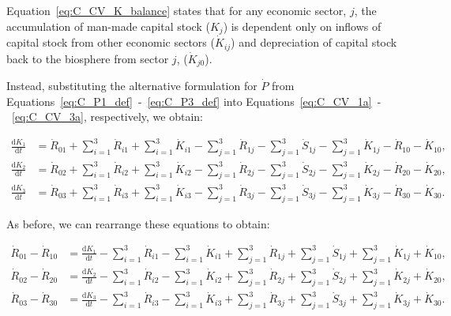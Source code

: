\noindent{}Equation~\ref{eq:C_CV_K_balance} states that
for any economic sector, $j$,
the accumulation of man-made capital stock ($K_{j}$)
is dependent only on inflows of capital stock
from other economic sectors
($\dot{K}_{ij}$)
and depreciation of capital stock back to the
biosphere from sector $j$, ($\dot{K}_{j0}$).

Instead,
substituting the alternative formulation for $\dot{P}$
from Equations~\ref{eq:C_P1_def}~-~\ref{eq:C_P3_def}
into Equations~\ref{eq:C_CV_1a}~-~\ref{eq:C_CV_3a},
respectively,
we obtain:

\begin{align} \label{eq:C_CV_1c}
	\frac{\mathrm{d}K_{1}}{\mathrm{d}t}	&
	= \dot{R}_{01}
	+ \sum_{i = 1}^{3}\dot{R}_{i1}
	+ \sum_{i = 1}^{3}\dot{K}_{i1}
	- \sum_{j = 1}^{3}\dot{R}_{1j}
	- \sum_{j = 1}^{3}\dot{S}_{1j}
	- \sum_{j = 1}^{3}\dot{K}_{1j}
	- \dot{R}_{10} 
	- \dot{K}_{10},										\\
	\label{eq:C_CV_2c}
	\frac{\mathrm{d}K_{2}}{\mathrm{d}t}	& 
	=  \dot{R}_{02} 
	+ \sum_{i = 1}^{3}\dot{R}_{i2}
	+ \sum_{i = 1}^{3}\dot{K}_{i2}
	- \sum_{j = 1}^{3}\dot{R}_{2j}
	- \sum_{j = 1}^{3}\dot{S}_{2j}
	- \sum_{j = 1}^{3}\dot{K}_{2j}
	- \dot{R}_{20} 
	- \dot{K}_{20},										\\	
	\label{eq:C_CV_3c}
	\frac{\mathrm{d}K_{3}}{\mathrm{d}t}	&
	=  \dot{R}_{03} 
	+ \sum_{i = 1}^{3}\dot{R}_{i3}
	+ \sum_{i = 1}^{3}\dot{K}_{i3}
	- \sum_{j = 1}^{3}\dot{R}_{3j}
	- \sum_{j = 1}^{3}\dot{S}_{3j}
	- \sum_{j = 1}^{3}\dot{K}_{3j}
	- \dot{R}_{30} 
	- \dot{K}_{30}.										
\end{align}

As before, we can rearrange these equations
to obtain:

\begin{align} \label{eq:C_CV_1d}
	\dot{R}_{01}
	- \dot{R}_{10} 											&
	=\frac{\mathrm{d}K_{1}}{\mathrm{d}t}
	- \sum_{i = 1}^{3}\dot{R}_{i1}
	- \sum_{i = 1}^{3}\dot{K}_{i1}
	+ \sum_{j = 1}^{3}\dot{R}_{1j}
	+ \sum_{j = 1}^{3}\dot{S}_{1j}
	+ \sum_{j = 1}^{3}\dot{K}_{1j}
	+ \dot{K}_{10},											\\
	\label{eq:C_CV_2d}
	\dot{R}_{02} 
	- \dot{R}_{20} 											&
	= \frac{\mathrm{d}K_{2}}{\mathrm{d}t}
	- \sum_{i = 1}^{3}\dot{R}_{i2}
	- \sum_{i = 1}^{3}\dot{K}_{i2}
	+ \sum_{j = 1}^{3}\dot{R}_{2j}
	+ \sum_{j = 1}^{3}\dot{S}_{2j}
	+ \sum_{j = 1}^{3}\dot{K}_{2j}
	+ \dot{K}_{20},											\\	
	\label{eq:C_CV_3d}
	\dot{R}_{03}
	- \dot{R}_{30} 											&
	= \frac{\mathrm{d}K_{3}}{\mathrm{d}t}
	- \sum_{i = 1}^{3}\dot{R}_{i3}
	- \sum_{i = 1}^{3}\dot{K}_{i3}
	+ \sum_{j = 1}^{3}\dot{R}_{3j}
	+ \sum_{j = 1}^{3}\dot{S}_{3j}
	+ \sum_{j = 1}^{3}\dot{K}_{3j}
	+ \dot{K}_{30}.										
\end{align}

